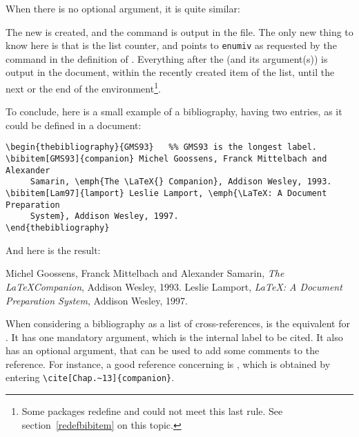 When there is no optional argument, it is quite similar:
%
\begin{listing}{1}
\def\@bibitem#1{\item\if@filesw \immediate\write\@auxout
       {\string\bibcite{#1}{\the\value{\@listctr}}}\fi\ignorespaces}
\end{listing}
%
The new  is created, and the  command is 
output in the  file. The only new thing to know here is that
 is the list counter, and points to \verb+enumiv+ as requested
by the  command in the definition of .
Everything after the  (and its argument(s)) is
output  in the document, within the recently created item of the
list, until the next  or the end of the
 environment\footnote{Some packages redefine
   and could not meet this last rule. See
  section~\ref{redefbibitem} on this topic.}.

\medskip
To conclude, here is a small example of a bibliography, having two
entries, as it could be defined in a document:

\begin{verbatim}
\begin{thebibliography}{GMS93}   %% GMS93 is the longest label.
\bibitem[GMS93]{companion} Michel Goossens, Franck Mittelbach and Alexander
     Samarin, \emph{The \LaTeX{} Companion}, Addison Wesley, 1993.
\bibitem[Lam97]{lamport} Leslie Lamport, \emph{\LaTeX: A Document Preparation
     System}, Addison Wesley, 1997.
\end{thebibliography}
\end{verbatim}
And here is the result:

\begin{myex}
\begin{thebibliography}{GMS93}
 Michel Goossens, Franck Mittelbach and Alexander
     Samarin, \emph{The \LaTeX Companion}, Addison Wesley, 1993.
 Leslie Lamport, \emph{\LaTeX: A Document Preparation
     System}, Addison Wesley, 1997.
\end{thebibliography}
\end{myex}


\label{cite}

When considering a bibliography as a list of cross-references,
 is the equivalent for . It has one mandatory
argument, which is the internal label to be cited. It also has an
optional argument, that can be used to add some comments to the
reference. For instance, a good reference concerning \bt is
\cite[Chap.~13]{latex:lc}, which is obtained by entering 
\verb+\cite[Chap.~13]{companion}+.\label{citeopt}


